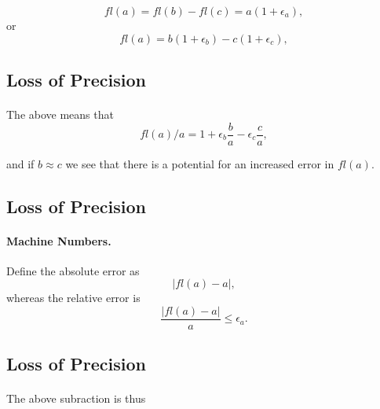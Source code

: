 \documentclass[%
oneside,                 %
final,                   %
10pt]{article}
\begin{document}
\begin{equation}
   fl(a)=fl(b)-fl(c) = a(1+\epsilon_a),
\end{equation}
or
\begin{equation}
   fl(a)=b(1+\epsilon_b)-c(1+\epsilon_c),
\end{equation}


\subsection*{Loss of Precision}

\paragraph{}
The above means that
\begin{equation}
   fl(a)/a=1+\epsilon_b\frac{b}{a}- \epsilon_c\frac{c}{a},
\end{equation}

and if $b\approx c$ we see that there is a potential for an increased
error in $fl(a)$.



\subsection*{Loss of Precision}


\paragraph{Machine Numbers.}
Define
the absolute error as
\begin{equation}
   |fl(a)-a|,
\end{equation}
whereas the relative error is
\begin{equation}
   \frac{ |fl(a)-a|}{a} \le \epsilon_a.
\end{equation}


\subsection*{Loss of Precision}

\paragraph{}
The above subraction is thus
\end{document}
